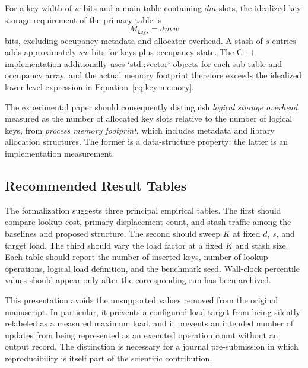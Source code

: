 \documentclass[conference]{IEEEtran}
\begin{document}
For a key width of $w$ bits and a main table containing $dm$ slots, the idealized key-storage requirement of the primary table is
\begin{equation}
    M_{\mathrm{keys}} = dm\,w
    \label{eq:key-memory}
\end{equation}
bits, excluding occupancy metadata and allocator overhead. A stash of $s$ entries adds approximately $sw$ bits for keys plus occupancy state. The C++ implementation additionally uses `std::vector` objects for each sub-table and occupancy array, and the actual memory footprint therefore exceeds the idealized lower-level expression in Equation~\eqref{eq:key-memory}.

The experimental paper should consequently distinguish \emph{logical storage overhead}, measured as the number of allocated key slots relative to the number of logical keys, from \emph{process memory footprint}, which includes metadata and library allocation structures. The former is a data-structure property; the latter is an implementation measurement.

\subsection{Recommended Result Tables}

The formalization suggests three principal empirical tables. The first should compare lookup cost, primary displacement count, and stash traffic among the baselines and proposed structure. The second should sweep $K$ at fixed $d$, $s$, and target load. The third should vary the load factor at a fixed $K$ and stash size. Each table should report the number of inserted keys, number of lookup operations, logical load definition, and the benchmark seed. Wall-clock percentile values should appear only after the corresponding run has been archived.

This presentation avoids the unsupported values removed from the original manuscript. In particular, it prevents a configured load target from being silently relabeled as a measured maximum load, and it prevents an intended number of updates from being represented as an executed operation count without an output record. The distinction is necessary for a journal pre-submission in which reproducibility is itself part of the scientific contribution.

\end{document}
